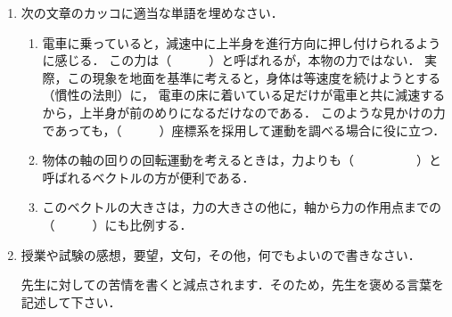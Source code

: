 \documentclass[a4paper,11pt]{ltjsarticle}
\begin{document}
\begin{enumerate}
\clearpage

    \item 次の文章のカッコに適当な単語を埋めなさい．
    
    \vspace{5pt}

    \begin{enumerate}[label=(\arabic*)]
        \item 電車に乗っていると，減速中に上半身を進行方向に押し付けられるように感じる．
        この力は（　　　）と呼ばれるが，本物の力ではない．
        実際，この現象を地面を基準に考えると，身体は等速度を続けようとする（慣性の法則）に，
        電車の床に着いている足だけが電車と共に減速するから，上半身が前のめりになるだけなのである．
        このような見かけの力であっても，（　　　）座標系を採用して運動を調べる場合に役に立つ．

        \item 物体の軸の回りの回転運動を考えるときは，力よりも（　　　　　）と呼ばれるベクトルの方が便利である．
        \item このベクトルの大きさは，力の大きさの他に，軸から力の作用点までの（　　　）にも比例する．
    \end{enumerate}

    \vspace{5pt}

    \item 授業や試験の感想，要望，文句，その他，何でもよいので書きなさい．

    \vspace{5pt}

    先生に対しての苦情を書くと減点されます．そのため，先生を褒める言葉を記述して下さい．

    \vspace{5pt}

\end{enumerate}
\end{document}
